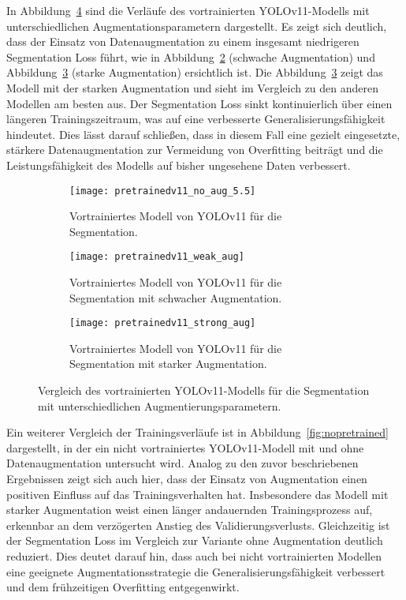 \documentclass[
	german,
	accentcolor=10c,%
	type=intern,
	marginpar=false
	]{tudapub}
\begin{document}
In Abbildung~\ref{fig:pretrainedv11} sind die Verläufe des vortrainierten YOLOv11-Modells mit unterschiedlichen Augmentationsparametern dargestellt. Es zeigt sich deutlich, dass der Einsatz von Datenaugmentation zu einem insgesamt niedrigeren Segmentation Loss führt, wie in Abbildung~\ref{fig:pretrainedv11_weak_aug} (schwache Augmentation) und Abbildung~\ref{fig:pretrainedv11_strong_aug} (starke Augmentation) ersichtlich ist. Die Abbildung~\ref{fig:pretrainedv11_strong_aug} zeigt das Modell mit der starken Augmentation und sieht im Vergleich zu den anderen Modellen am besten aus. Der Segmentation Loss sinkt kontinuierlich über einen längeren Trainingszeitraum, was auf eine verbesserte Generalisierungsfähigkeit hindeutet. Dies lässt darauf schließen, dass in diesem Fall eine gezielt eingesetzte, stärkere Datenaugmentation zur Vermeidung von Overfitting beiträgt und die Leistungsfähigkeit des Modells auf bisher ungesehene Daten verbessert. 

\begin{figure}[H]
    \centering
    \begin{subfigure}[b]{0.3\textwidth}
        \texttt{[image: pretrainedv11\_no\_aug\_5.5]}
        \caption{Vortrainiertes Modell von YOLOv11 für die Segmentation.}
        \label{fig:pretrainedv11_no_aug_5.5}
    \end{subfigure}
    \hfill
    \begin{subfigure}[b]{0.3\textwidth}
        \texttt{[image: pretrainedv11\_weak\_aug]}
        \caption{Vortrainiertes Modell von YOLOv11 für die Segmentation mit schwacher Augmentation.}
        \label{fig:pretrainedv11_weak_aug}
    \end{subfigure}
    \hfill
    \begin{subfigure}[b]{0.3\textwidth}
        \texttt{[image: pretrainedv11\_strong\_aug]}
        \caption{Vortrainiertes Modell von YOLOv11 für die Segmentation mit starker Augmentation.}
        \label{fig:pretrainedv11_strong_aug}
    \end{subfigure}    
    \caption{Vergleich des vortrainierten YOLOv11-Modells für die Segmentation mit unterschiedlichen Augmentierungsparametern.}
    \label{fig:pretrainedv11}
\end{figure}

Ein weiterer Vergleich der Trainingsverläufe ist in Abbildung~\ref{fig:nopretrained} dargestellt, in der ein nicht vortrainiertes YOLOv11-Modell mit und ohne Datenaugmentation untersucht wird. Analog zu den zuvor beschriebenen Ergebnissen zeigt sich auch hier, dass der Einsatz von Augmentation einen positiven Einfluss auf das Trainingsverhalten hat. Insbesondere das Modell mit starker Augmentation weist einen länger andauernden Trainingsprozess auf, erkennbar an dem verzögerten Anstieg des Validierungsverlusts. Gleichzeitig ist der Segmentation Loss im Vergleich zur Variante ohne Augmentation deutlich reduziert. Dies deutet darauf hin, dass auch bei nicht vortrainierten Modellen eine geeignete Augmentationsstrategie die Generalisierungsfähigkeit verbessert und dem frühzeitigen Overfitting entgegenwirkt.
\end{document}

